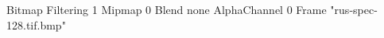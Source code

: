 {Bitmap
	{Filtering 1}
	{Mipmap 0}
	{Blend none}
	{AlphaChannel 0}
	{Frame "rus-spec-128.tif.bmp"}
}
